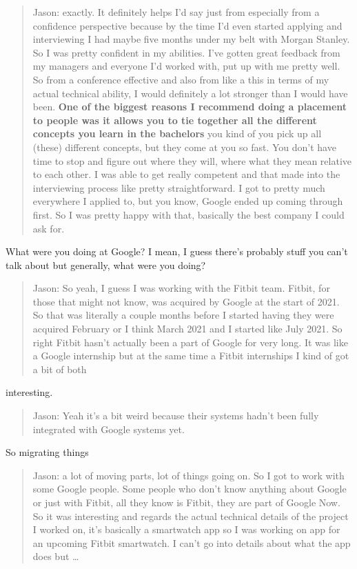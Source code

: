 \documentclass[
]{book}
\begin{document}
\begin{quote}
Jason: exactly. It definitely helps I'd say just from especially from a confidence perspective because by the time I'd even started applying and interviewing I had maybe five months under my belt with Morgan Stanley. So I was pretty confident in my abilities. I've gotten great feedback from my managers and everyone I'd worked with, put up with me pretty well. So from a conference effective and also from like a this in terms of my actual technical ability, I would definitely a lot stronger than I would have been. \textbf{One of the biggest reasons I recommend doing a placement to people was it allows you to tie together all the different concepts you learn in the bachelors} you kind of you pick up all (these) different concepts, but they come at you so fast. You don't have time to stop and figure out where they will, where what they mean relative to each other. I was able to get really competent and that made into the interviewing process like pretty straightforward. I got to pretty much everywhere I applied to, but you know, Google ended up coming through first. So I was pretty happy with that, basically the best company I could ask for.
\end{quote}

What were you doing at Google? I mean, I guess there's probably stuff you can't talk about but generally, what were you doing?

\begin{quote}
Jason: So yeah, I guess I was working with the Fitbit team. Fitbit, for those that might not know, was acquired by Google at the start of 2021. So that was literally a couple months before I started having they were acquired February or I think March 2021 and I started like July 2021. So right Fitbit hasn't actually been a part of Google for very long. It was like a Google internship but at the same time a Fitbit internships I kind of got a bit of both
\end{quote}

interesting.

\begin{quote}
Jason: Yeah it's a bit weird because their systems hadn't been fully integrated with Google systems yet.
\end{quote}

So migrating things

\begin{quote}
Jason: a lot of moving parts, lot of things going on. So I got to work with some Google people. Some people who don't know anything about Google or just with Fitbit, all they know is Fitbit, they are part of Google Now. So it was interesting and regards the actual technical details of the project I worked on, it's basically a smartwatch app so I was working on app for an upcoming Fitbit smartwatch. I can't go into details about what the app does but \ldots{}
\end{quote}
\end{document}
